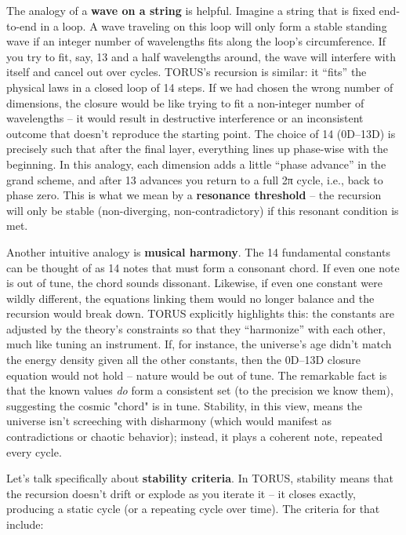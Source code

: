 \documentclass[]{article}
\begin{document}
The analogy of a \textbf{wave on a string} is helpful. Imagine a string
that is fixed end-to-end in a loop. A wave traveling on this loop will
only form a stable standing wave if an integer number of wavelengths
fits along the loop's circumference. If you try to fit, say, 13 and a
half wavelengths around, the wave will interfere with itself and cancel
out over cycles. TORUS's recursion is similar: it ``fits'' the physical
laws in a closed loop of 14 steps. If we had chosen the wrong number of
dimensions, the closure would be like trying to fit a non-integer number
of wavelengths -- it would result in destructive interference or an
inconsistent outcome that doesn't reproduce the starting point​. The
choice of 14 (0D--13D) is precisely such that after the final layer,
everything lines up phase-wise with the beginning. In this analogy, each
dimension adds a little ``phase advance'' in the grand scheme, and after
13 advances you return to a full 2π cycle, i.e., back to phase zero​.
This is what we mean by a \textbf{resonance threshold} -- the recursion
will only be stable (non-diverging, non-contradictory) if this resonant
condition is met.

Another intuitive analogy is \textbf{musical harmony}. The 14
fundamental constants can be thought of as 14 notes that must form a
consonant chord. If even one note is out of tune, the chord sounds
dissonant. Likewise, if even one constant were wildly different, the
equations linking them would no longer balance and the recursion would
break down. TORUS explicitly highlights this: the constants are adjusted
by the theory's constraints so that they ``harmonize'' with each other,
much like tuning an instrument​. If, for instance, the universe's age
didn't match the energy density given all the other constants, then the
0D--13D closure equation would not hold -- nature would be out of tune.
The remarkable fact is that the known values \emph{do} form a consistent
set (to the precision we know them), suggesting the cosmic "chord" is in
tune. Stability, in this view, means the universe isn't screeching with
disharmony (which would manifest as contradictions or chaotic behavior);
instead, it plays a coherent note, repeated every cycle.

Let's talk specifically about \textbf{stability criteria}. In TORUS,
stability means that the recursion doesn't drift or explode as you
iterate it -- it closes exactly, producing a static cycle (or a
repeating cycle over time). The criteria for that include:
\end{document}
